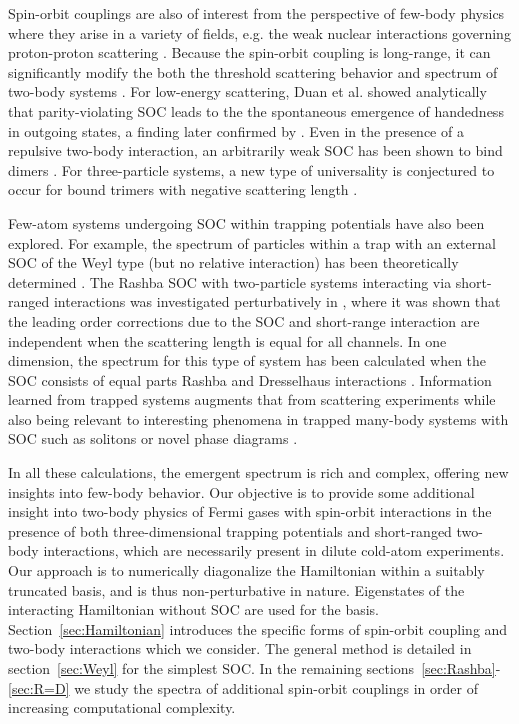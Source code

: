 \documentclass[%
 notitlepage,
 preprint,
showpacs,%
 amsmath,amssymb,
 aps,
pra,
]{revtex4-1}
\begin{document}
\color{red}
Spin-orbit couplings are also of interest from the perspective of few-body physics where they arise in a variety of fields, e.g. the weak nuclear interactions governing proton-proton scattering \cite{Haxton:2013aca,deVries:2014vqa}. Because the spin-orbit coupling is long-range, it can significantly modify the both the threshold scattering behavior and spectrum of two-body systems \cite{PhysRevA.86.042707}. For low-energy scattering, Duan et al. \cite{PhysRevA.87.052708} showed analytically that parity-violating SOC leads to the the spontaneous emergence of handedness in outgoing states, a finding later confirmed by \cite{PhysRevA.91.022706}. Even in the presence of a repulsive two-body interaction, an arbitrarily weak SOC has been shown to bind dimers \cite{PhysRevB.83.094515}. For three-particle systems, a new type of universality is conjectured to occur for bound trimers with negative scattering length \cite{PhysRevLett.112.013201}. 

Few-atom systems undergoing SOC within trapping potentials have also been explored. For example, the spectrum of particles within a trap with an external SOC of the Weyl type (but no relative interaction) has been theoretically determined \cite{anderson2013}. The Rashba SOC with two-particle systems interacting via short-ranged interactions was investigated perturbatively in \cite{PhysRevA.89.033606}, where it was shown that the leading order corrections due to the SOC and short-range interaction are independent when the scattering length is equal for all channels.  In one dimension, the spectrum for this type of system has been calculated when the SOC consists of equal parts Rashba and Dresselhaus interactions \cite{guan2014energy}. Information learned from trapped systems augments that from scattering experiments while also being relevant to interesting phenomena in trapped many-body systems with SOC such as solitons \cite{DarkSolitons,PhysRevA.87.013614} or novel phase diagrams \cite{PhysRevLett.107.270401}.

\color{black}

In all these calculations, the emergent spectrum is rich and complex, offering new insights into few-body behavior.  Our objective is to provide some additional insight into two-body physics of Fermi gases with spin-orbit interactions in the presence of \color{red}both \color{black} three-dimensional trapping potentials and short-ranged two-body interactions, which are necessarily present in dilute cold-atom experiments. Our approach is to numerically diagonalize the Hamiltonian within a suitably truncated basis, and is thus non-perturbative in nature. Eigenstates of the interacting Hamiltonian without SOC are used for the basis. Section~\ref{sec:Hamiltonian} introduces the specific forms of spin-orbit coupling and two-body interactions which we consider. The general method is detailed in section~\ref{sec:Weyl} for the simplest SOC.  In the remaining sections~\ref{sec:Rashba}-\ref{sec:R=D} we study the spectra of additional spin-orbit couplings in order of increasing computational complexity.
\end{document}
